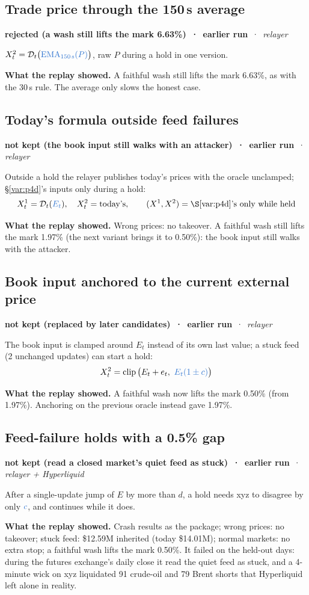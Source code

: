 \documentclass[10.5pt,a4paper]{article}
\newcommand{\chg}[1]{\ensuremath{{\color[HTML]{2F74D0}#1}}}
\newcommand{\clip}{\operatorname{clip}}
\newcommand{\ema}{\operatorname{EMA}}
\newcommand{\D}{\mathcal{D}}
\newcommand{\st}[3]{\textcolor{#1}{\textbf{#2}} \,·\, \emph{#3}\par}
\newcommand{\res}[1]{\par\textbf{What the replay showed.} #1\par}
\begin{document}
\subsection{Trade price through the 150\,s average}\label{var:auto20}
\st{rej}{rejected (a wash still lifts the mark 6.63\%) \,·\, earlier run}{relayer}
$X^2_t = \D_t\big(\chg{\ema_{150\,\text{s}}(P)}\big)$, raw $P$ during a hold in one version.
\res{A faithful wash still lifts the mark 6.63\%, as with the 30\,s rule. The average only slows the honest case.}

\subsection{Today's formula outside feed failures}\label{var:auto21}
\st{sup}{not kept (the book input still walks with an attacker) \,·\, earlier run}{relayer}
Outside a hold the relayer publishes today's prices with the oracle unclamped; \S\ref{var:p4d}'s inputs only during a hold:
\begin{equation}
X^1_t = \D_t(\chg{E_t}),\quad X^2_t = \text{today's},\qquad (X^1,X^2) = \text{\S\ref{var:p4d}'s} \ \text{only while held}
\end{equation}
\res{Wrong prices: no takeover. A faithful wash still lifts the mark 1.97\% (the next variant brings it to 0.50\%): the book input still walks with the attacker.}

\subsection{Book input anchored to the current external price}\label{var:anch}
\st{sup}{not kept (replaced by later candidates) \,·\, earlier run}{relayer}
The book input is clamped around $E_t$ instead of its own last value; a stuck feed (2 unchanged updates) can start a hold:
\begin{equation}
X^2_t = \clip\big(E_t + e_t,\ \chg{E_t(1\pm c)}\big)
\end{equation}
\res{A faithful wash now lifts the mark 0.50\% (from 1.97\%). Anchoring on the previous oracle instead gave 1.97\%.}

\subsection{Feed-failure holds with a 0.5\% gap}\label{var:pv}
\st{sup}{not kept (read a closed market's quiet feed as stuck) \,·\, earlier run}{relayer + Hyperliquid}
After a single-update jump of $E$ by more than $d$, a hold needs xyz to disagree by only $\chg{c}$, and continues while it does.
\res{Crash results as the package; wrong prices: no takeover; stuck feed: \$12.59M inherited (today \$14.01M); normal markets: no extra stop; a faithful wash lifts the mark 0.50\%. It failed on the held-out days: during the futures exchange's daily close it read the quiet feed as stuck, and a 4-minute wick on xyz liquidated 91 crude-oil and 79 Brent shorts that Hyperliquid left alone in reality.}
\end{document}
